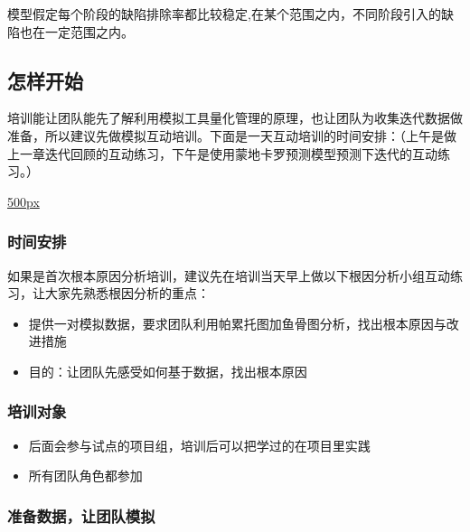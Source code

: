 模型假定每个阶段的缺陷排除率都比较稳定,在某个范围之内，不同阶段引入的缺陷也在一定范围之内。

\hypertarget{ux600eux6837ux5f00ux59cb}{%
\subsection{怎样开始}\label{ux600eux6837ux5f00ux59cb}}

培训能让团队能先了解利用模拟工具量化管理的原理，也让团队为收集迭代数据做准备，所以建议先做模拟互动培训。下面是一天互动培训的时间安排：（上午是做上一章迭代回顾的互动练习，下午是使用蒙地卡罗预测模型预测下迭代的互动练习。）

\href{文件:712trainingAgendaScreenshot_2022-07-12_125030.jpg}{500px}

\hypertarget{ux65f6ux95f4ux5b89ux6392}{%
\subsubsection{时间安排}\label{ux65f6ux95f4ux5b89ux6392}}

如果是首次根本原因分析培训，建议先在培训当天早上做以下根因分析小组互动练习，让大家先熟悉根因分析的重点：

\begin{itemize}
\tightlist
\item
  提供一对模拟数据，要求团队利用帕累托图加鱼骨图分析，找出根本原因与改进措施
\item
  目的：让团队先感受如何基于数据，找出根本原因
\end{itemize}

\hypertarget{ux57f9ux8badux5bf9ux8c61}{%
\subsubsection{培训对象}\label{ux57f9ux8badux5bf9ux8c61}}

\begin{itemize}
\tightlist
\item
  后面会参与试点的项目组，培训后可以把学过的在项目里实践
\item
  所有团队角色都参加
\end{itemize}

\hypertarget{ux51c6ux5907ux6570ux636eux8ba9ux56e2ux961fux6a21ux62df}{%
\subsubsection{准备数据，让团队模拟}\label{ux51c6ux5907ux6570ux636eux8ba9ux56e2ux961fux6a21ux62df}}

